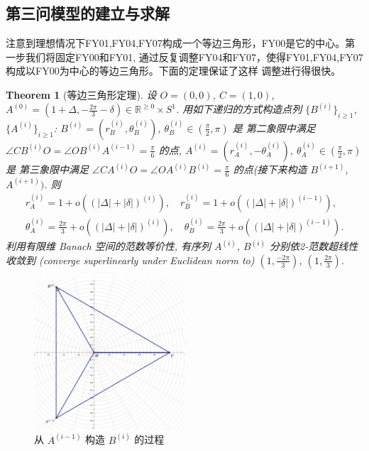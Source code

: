\documentclass{my_paper}
\newcommand{\R}{\mathbb{R}}
\newtheorem{theorem}{Theorem}
\begin{document}
\subsection{第三问模型的建立与求解}
    注意到理想情况下FY01,FY04,FY07构成一个等边三角形，FY00是它的中心。第一步我们将固定FY00和FY01,
    通过反复调整FY04和FY07，使得FY01,FY04,FY07构成以FY00为中心的等边三角形。下面的定理保证了这样
    调整进行得很快。
\begin{theorem}[等边三角形定理]
\label{dbsjx} 
    设 $O=(0,0)$, $C=(1,0)$,   
    $A^{(0)}=(1+\Delta,-\frac{2\pi}3-\delta)\in \R^{\geq 0}\times S^1$. 用如下递归的方式构造点列
    $\{B^{(i)}\}_{i\geq 1}$, $\{A^{(i)}\}_{i\geq 1}$: 
    $B^{(i)}=(r_B^{(i)},\theta_B^{(i)})$, $\theta_{B}^{(i)}\in (\frac \pi 2,\pi)$ 是
    第二象限中满足 $\angle CB^{(i)}O=\angle OB^{(i)}A^{(i-1)}=\frac\pi6$ 的点, 
    $A^{(i)}=(r_A^{(i)},-\theta_A^{(i)})$, $\theta_{A}^{(i)}\in (\frac \pi 2,\pi)$ 是
    第三象限中满足 $\angle CA^{(i)}O=\angle OA^{(i)}B^{(i)}=\frac\pi6$ 的点(接下来构造 $B^{(i+1)}$, $A^{(i+1)})$. 
    则 
    \begin{equation}
    \begin{aligned}
        r_A^{(i)}=1+o((|\Delta|+|\delta|)^{(i)}),\quad r_B^{(i)}=1+o((|\Delta|+|\delta|)^{(i-1)}),
        \\
        \theta_A^{(i)}=\frac{2\pi}{3}+o((|\Delta|+|\delta|)^{(i)}),\quad \theta_B^{(i)}=\frac{2\pi}{3}+o((|\Delta|+|\delta|)^{(i-1)}).
    \end{aligned}
    \label{1}
    \end{equation}
    利用有限维 Banach 空间的范数等价性, 有序列 $A^{(i)}$, $B^{(i)}$ 分别依2-范数超线性收敛到
    (converge superlinearly under Euclidean norm to) $(1,\frac{-2\pi}3)$, $(1,\frac{2\pi}3)$.
\end{theorem} 

\begin{figure}[H]
    \centering
    \includegraphics[width=0.5\textwidth]{sketch1}
    \caption{从 $A^{(i-1)}$ 构造 $B^{(i)}$ 的过程} 
\end{figure}
\end{document}
